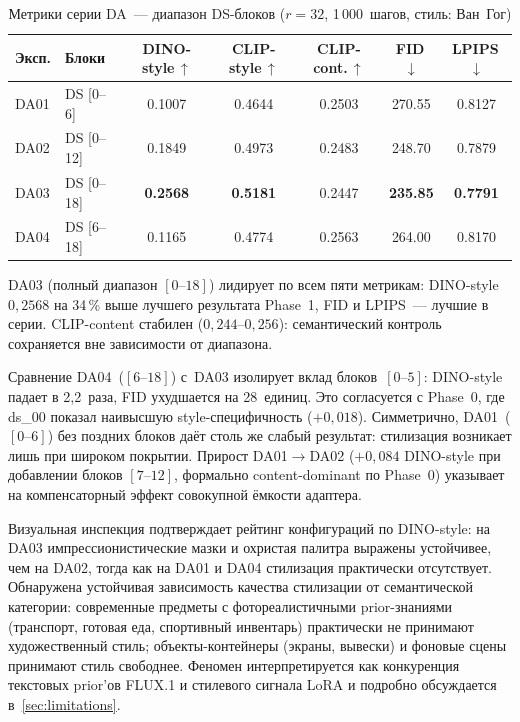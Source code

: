 \begin{table}[h]
\centering
\caption{Метрики серии DA~--- диапазон DS-блоков ($r{=}32$, 1\,000~шагов, стиль: Ван~Гог)}
\label{tab:phase2_da_metrics}
\begingroup\small
\begin{tabular}{llccccc}
\hline
\textbf{Эксп.} & \textbf{Блоки} & \textbf{DINO-style\,$\uparrow$} & \textbf{CLIP-style\,$\uparrow$} & \textbf{CLIP-cont.\,$\uparrow$} & \textbf{FID\,$\downarrow$} & \textbf{LPIPS\,$\downarrow$} \\
\hline
DA01 & DS [0–6]  & 0.1007          & 0.4644          & 0.2503 & 270.55          & 0.8127          \\
DA02 & DS [0–12] & 0.1849          & 0.4973          & 0.2483 & 248.70          & 0.7879          \\
DA03 & DS [0–18] & \textbf{0.2568} & \textbf{0.5181} & 0.2447 & \textbf{235.85} & \textbf{0.7791} \\
DA04 & DS [6–18] & 0.1165          & 0.4774          & 0.2563 & 264.00          & 0.8170          \\
\hline
\end{tabular}\endgroup
\end{table}

DA03 (полный диапазон $[0\text{--}18]$) лидирует по всем пяти метрикам: DINO-style $0{,}2568$ на 34\,\% выше лучшего результата Phase~1, FID и LPIPS~--- лучшие в серии. CLIP-content стабилен ($0{,}244$--$0{,}256$): семантический контроль сохраняется вне зависимости от диапазона.

Сравнение DA04~($[6\text{--}18]$) с~DA03 изолирует вклад блоков~$[0\text{--}5]$: DINO-style падает в 2{,}2~раза, FID ухудшается на 28~единиц. Это согласуется с Phase~0, где ds\_00 показал наивысшую style-специфичность ($+0{,}018$). Симметрично, DA01~($[0\text{--}6]$) без поздних блоков даёт столь же слабый результат: стилизация возникает лишь при широком покрытии. Прирост DA01$\to$DA02 ($+0{,}084$ DINO-style при добавлении блоков $[7\text{--}12]$, формально content-dominant по Phase~0) указывает на компенсаторный эффект совокупной ёмкости адаптера.

Визуальная инспекция подтверждает рейтинг конфигураций по DINO-style: на DA03 импрессионистические мазки и охристая палитра выражены устойчивее, чем на DA02, тогда как на DA01 и DA04 стилизация практически отсутствует. Обнаружена устойчивая зависимость качества стилизации от семантической категории: современные предметы с фотореалистичными prior-знаниями (транспорт, готовая еда, спортивный инвентарь) практически не принимают художественный стиль; объекты-контейнеры (экраны, вывески) и фоновые сцены принимают стиль свободнее. Феномен интерпретируется как конкуренция текстовых prior'ов FLUX.1 и стилевого сигнала LoRA и подробно обсуждается в~\ref{sec:limitations}.

